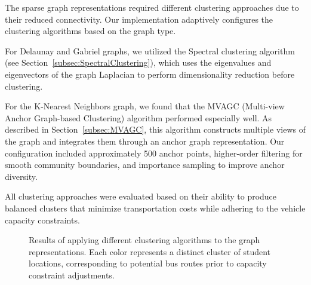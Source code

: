 The sparse graph representations required different clustering approaches due to their reduced connectivity. Our implementation adaptively configures the clustering algorithms based on the graph type.

For Delaunay and Gabriel graphs, we utilized the Spectral clustering algorithm (see Section~\ref{subsec:SpectralClustering}), which uses the eigenvalues and eigenvectors of the graph Laplacian to perform dimensionality reduction before clustering.

For the K-Nearest Neighbors graph, we found that the MVAGC (Multi-view Anchor Graph-based Clustering) algorithm performed especially well. As described in Section~\ref{subsec:MVAGC}, this algorithm constructs multiple views of the graph and integrates them through an anchor graph representation. Our configuration included approximately 500 anchor points, higher-order filtering for smooth community boundaries, and importance sampling to improve anchor diversity.

All clustering approaches were evaluated based on their ability to produce balanced clusters that minimize transportation costs while adhering to the vehicle capacity constraints.

\begin{figure}[!htbp]
\centering
{}
\caption{Results of applying different clustering algorithms to the graph representations. Each color represents a distinct cluster of student locations, corresponding to potential bus routes prior to capacity constraint adjustments.}
\label{fig:clustering_example}
\end{figure}

